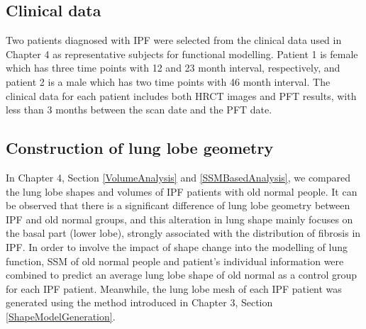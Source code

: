 \subsection{Clinical data}
Two patients diagnosed with IPF were selected from the clinical data used in Chapter 4 as representative subjects for functional modelling. Patient 1 is female which has three time points with 12 and 23 month interval, respectively, and patient 2 is a male which has two time points with 46 month interval. The clinical data for each patient includes both HRCT images and PFT results, with less than 3 months between the scan date and the PFT date. 

\subsection{Construction of lung lobe geometry}
In Chapter 4, Section \ref{VolumeAnalysis} and \ref{SSMBasedAnalysis}, we compared the lung lobe shapes and volumes of IPF patients with old normal people. It can be observed that there is a significant difference of lung lobe geometry between IPF and old normal groups, and this alteration in lung shape mainly focuses on the basal part (lower lobe), strongly associated with the distribution of fibrosis in IPF. In order to involve the impact of shape change into the modelling of lung function, SSM of old normal people and patient's individual information were combined to predict an average lung lobe shape of old normal as a control group for each IPF patient. Meanwhile, the lung lobe mesh of each IPF patient was generated using the method introduced in Chapter 3, Section \ref{ShapeModelGeneration}.

